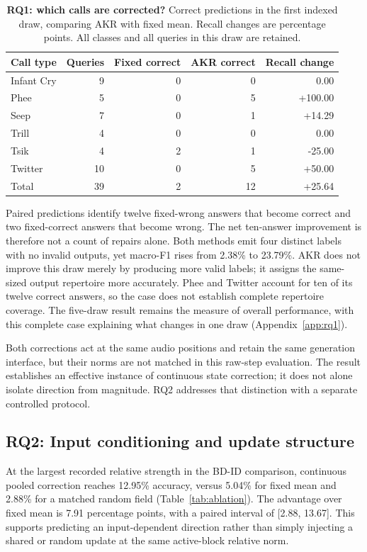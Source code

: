 \documentclass{article}
\begin{document}
\begin{table}[t]
\caption{\textbf{RQ1: which calls are corrected?} Correct predictions in the first indexed draw, comparing AKR with fixed mean. Recall changes are percentage points. All classes and all queries in this draw are retained.}
\label{tab:classes}
\centering\small
\begin{tabular}{@{}lrrrr@{}}
\toprule
Call type & Queries & Fixed correct & AKR correct & Recall change \\
\midrule
Infant Cry & 9 & 0 & 0 & 0.00 \\
Phee & 5 & 0 & 5 & +100.00 \\
Seep & 7 & 0 & 1 & +14.29 \\
Trill & 4 & 0 & 0 & 0.00 \\
Tsik & 4 & 2 & 1 & -25.00 \\
Twitter & 10 & 0 & 5 & +50.00 \\
\midrule
Total & 39 & 2 & 12 & +25.64 \\
\bottomrule
\end{tabular}
\end{table}

Paired predictions identify twelve fixed-wrong answers that become correct and two fixed-correct answers that become wrong. The net ten-answer improvement is therefore not a count of repairs alone. Both methods emit four distinct labels with no invalid outputs, yet macro-F1 rises from 2.38\% to 23.79\%. AKR does not improve this draw merely by producing more valid labels; it assigns the same-sized output repertoire more accurately. Phee and Twitter account for ten of its twelve correct answers, so the case does not establish complete repertoire coverage. The five-draw result remains the measure of overall performance, with this complete case explaining what changes in one draw (Appendix~\ref{app:rq1}).

Both corrections act at the same audio positions and retain the same generation interface, but their norms are not matched in this raw-step evaluation. The result establishes an effective instance of continuous state correction; it does not alone isolate direction from magnitude. RQ2 addresses that distinction with a separate controlled protocol.

\subsection{RQ2: Input conditioning and update structure}
\label{sec:rq2}
At the largest recorded relative strength in the BD-ID comparison, continuous pooled correction reaches 12.95\% accuracy, versus 5.04\% for fixed mean and 2.88\% for a matched random field (Table~\ref{tab:ablation}). The advantage over fixed mean is 7.91 percentage points, with a paired interval of [2.88, 13.67]. This supports predicting an input-dependent direction rather than simply injecting a shared or random update at the same active-block relative norm.
\end{document}
